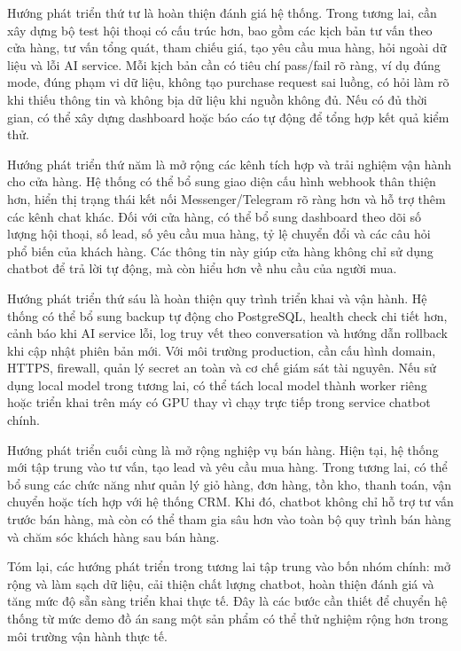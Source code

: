 \documentclass[../DoAn.tex]{subfiles}
\begin{document}
Hướng phát triển thứ tư là hoàn thiện đánh giá hệ thống. Trong tương lai, cần xây dựng bộ test hội thoại có cấu trúc hơn, bao gồm các kịch bản tư vấn theo cửa hàng, tư vấn tổng quát, tham chiếu giá, tạo yêu cầu mua hàng, hỏi ngoài dữ liệu và lỗi AI service. Mỗi kịch bản cần có tiêu chí pass/fail rõ ràng, ví dụ đúng mode, đúng phạm vi dữ liệu, không tạo purchase request sai luồng, có hỏi làm rõ khi thiếu thông tin và không bịa dữ liệu khi nguồn không đủ. Nếu có đủ thời gian, có thể xây dựng dashboard hoặc báo cáo tự động để tổng hợp kết quả kiểm thử.

Hướng phát triển thứ năm là mở rộng các kênh tích hợp và trải nghiệm vận hành cho cửa hàng. Hệ thống có thể bổ sung giao diện cấu hình webhook thân thiện hơn, hiển thị trạng thái kết nối Messenger/Telegram rõ ràng hơn và hỗ trợ thêm các kênh chat khác. Đối với cửa hàng, có thể bổ sung dashboard theo dõi số lượng hội thoại, số lead, số yêu cầu mua hàng, tỷ lệ chuyển đổi và các câu hỏi phổ biến của khách hàng. Các thông tin này giúp cửa hàng không chỉ sử dụng chatbot để trả lời tự động, mà còn hiểu hơn về nhu cầu của người mua.

Hướng phát triển thứ sáu là hoàn thiện quy trình triển khai và vận hành. Hệ thống có thể bổ sung backup tự động cho PostgreSQL, health check chi tiết hơn, cảnh báo khi AI service lỗi, log truy vết theo conversation và hướng dẫn rollback khi cập nhật phiên bản mới. Với môi trường production, cần cấu hình domain, HTTPS, firewall, quản lý secret an toàn và cơ chế giám sát tài nguyên. Nếu sử dụng local model trong tương lai, có thể tách local model thành worker riêng hoặc triển khai trên máy có GPU thay vì chạy trực tiếp trong service chatbot chính.

Hướng phát triển cuối cùng là mở rộng nghiệp vụ bán hàng. Hiện tại, hệ thống mới tập trung vào tư vấn, tạo lead và yêu cầu mua hàng. Trong tương lai, có thể bổ sung các chức năng như quản lý giỏ hàng, đơn hàng, tồn kho, thanh toán, vận chuyển hoặc tích hợp với hệ thống CRM. Khi đó, chatbot không chỉ hỗ trợ tư vấn trước bán hàng, mà còn có thể tham gia sâu hơn vào toàn bộ quy trình bán hàng và chăm sóc khách hàng sau bán hàng.

Tóm lại, các hướng phát triển trong tương lai tập trung vào bốn nhóm chính: mở rộng và làm sạch dữ liệu, cải thiện chất lượng chatbot, hoàn thiện đánh giá và tăng mức độ sẵn sàng triển khai thực tế. Đây là các bước cần thiết để chuyển hệ thống từ mức demo đồ án sang một sản phẩm có thể thử nghiệm rộng hơn trong môi trường vận hành thực tế.
\end{document}
